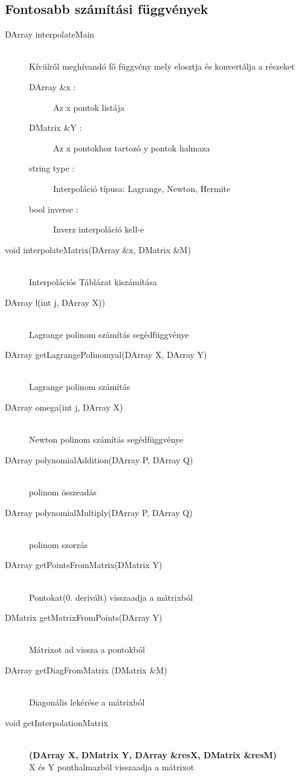 \subsection{Fontosabb számítási függvények}
	\begin{description}
		\item[DArray interpolateMain] 
			\hfill \\ Kívülről meghívandó fő függvény mely elosztja és konvertálja a részeket
			\begin{description}
			  \item[DArray \&x :] Az x pontok listája 
			  \item[DMatrix \&Y :] Az x pontokhoz tartozó y pontok halmaza
			  \item[string type :] 
			  	Interpoláció típusa: Lagrange, Newton, Hermite
			  \item[bool inverse :] Inverz interpoláció kell-e
			\end{description}
		\item[void interpolateMatrix(DArray \&x, 	DMatrix \&M)] \hfill \\ 
			Interpolációs Táblázat kiszámítása
		\item[DArray l(int j, DArray X))] \hfill \\ 
			Lagrange polinom számítás segédfüggvénye
		\item[DArray getLagrangePolinomyal(DArray X, DArray Y)] \hfill \\ 
			Lagrange polinom számítás
		\item[DArray omega(int j, DArray X)] \hfill \\ 
			Newton polinom számítás segédfüggvénye
		\item[DArray polynomialAddition(DArray P, DArray Q)] \hfill \\ 
			polinom összeadás
		\item[DArray polynomialMultiply(DArray P, DArray Q)] \hfill \\ 
			polinom szorzás
		\item[DArray getPointsFromMatrix(DMatrix Y)] \hfill \\ 
			Pontokat(0. derivált) visszaadja a mátrixból
		\item[DMatrix getMatrixFromPoints(DArray Y)] \hfill \\ 
			Mátrixot ad vissza a pontokból
		\item[DArray getDiagFromMatrix (DMatrix \&M)] 
		\hfill \\
			Diagonális lekérése a mátrixból
		\item[void getInterpolationMatrix]
		\hfill \\  \textbf{(DArray X, DMatrix Y, DArray \&resX, DMatrix \&resM)}
		\hfill \\
			 X és Y ponthalmazból visszaadja a mátrixot 
	\end{description}
